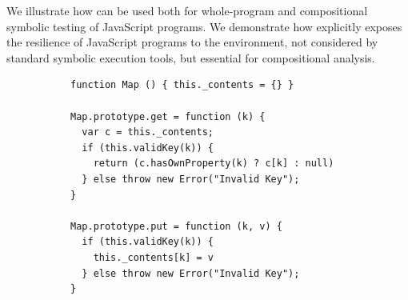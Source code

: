 
We illustrate how \cosette can be used both for whole-program and compositional symbolic testing of JavaScript programs. We demonstrate how \cosette  explicitly exposes the resilience of JavaScript programs to the environment, not considered by standard symbolic execution tools, but essential for compositional analysis.

 \begin{figure}[t]
 \centering
 \begin{subfigure}[b]{0.33\textwidth}
 {
 \begin{lstlisting}
function Map () { this._contents = {} }

Map.prototype.get = function (k) {
  var c = this._contents;
  if (this.validKey(k)) {
    return (c.hasOwnProperty(k) ? c[k] : null)
  } else throw new Error("Invalid Key");
}

Map.prototype.put = function (k, v) {
  if (this.validKey(k)) {  
    this._contents[k] = v   
  } else throw new Error("Invalid Key");
} 


\end{lstlisting}}
\end{subfigure}
\end{figure}
